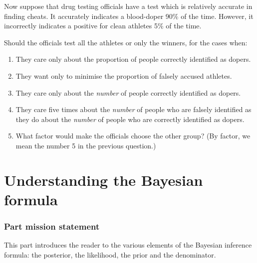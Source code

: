 \documentclass[11pt,fullpage]{book}
\begin{document}
Now suppose that drug testing officials have a test which is relatively accurate in finding cheats. It accurately indicates a blood-doper 90\% of the time. However, it incorrectly indicates a positive for clean athletes 5\% of the time. 

Should the officials test all the athletes or only the winners, for the cases when:

\begin{enumerate}
\item They care only about the proportion of people correctly identified as dopers.
\item They want only to minimise the proportion of falsely accused athletes.
\item They care only about the \textit{number} of people correctly identified as dopers.
\item They care five times about the \textit{number} of people who are falsely identified as they do about the \textit{number} of people who are correctly identified as dopers.
\item What factor would make the officials choose the other group? (By factor, we mean the number 5 in the previous question.)
\end{enumerate}


\part{Understanding the Bayesian formula}\label{part:bayesianFormula}
\section{Part mission statement}
This part introduces the reader to the various elements of the Bayesian inference formula: the posterior, the likelihood, the prior and the denominator.
\end{document}
